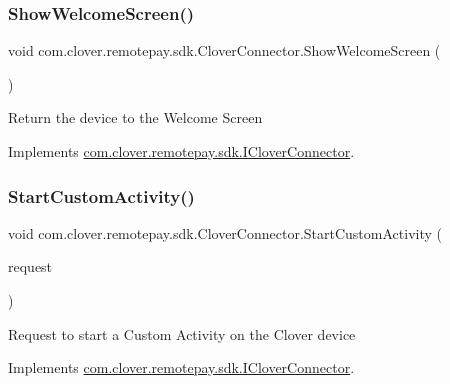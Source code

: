 \subsubsection{\texorpdfstring{Show\+Welcome\+Screen()}{ShowWelcomeScreen()}}
{\footnotesize\ttfamily void com.\+clover.\+remotepay.\+sdk.\+Clover\+Connector.\+Show\+Welcome\+Screen (\begin{DoxyParamCaption}{ }\end{DoxyParamCaption})}



Return the device to the Welcome Screen 



Implements \hyperlink{interfacecom_1_1clover_1_1remotepay_1_1sdk_1_1_i_clover_connector_a462fd3dbb5914ac1d5b906dd1daa57c0}{com.\+clover.\+remotepay.\+sdk.\+I\+Clover\+Connector}.

\mbox{\label{classcom_1_1clover_1_1remotepay_1_1sdk_1_1_clover_connector_a7c4a08c49e7285e95d7e36340ebe3306}} 
\subsubsection{\texorpdfstring{Start\+Custom\+Activity()}{StartCustomActivity()}}
{\footnotesize\ttfamily void com.\+clover.\+remotepay.\+sdk.\+Clover\+Connector.\+Start\+Custom\+Activity (\begin{DoxyParamCaption}\item[{\hyperlink{classcom_1_1clover_1_1remotepay_1_1sdk_1_1_custom_activity_request}{Custom\+Activity\+Request}}]{request }\end{DoxyParamCaption})}



Request to start a Custom Activity on the Clover device 



Implements \hyperlink{interfacecom_1_1clover_1_1remotepay_1_1sdk_1_1_i_clover_connector_a3ec58f5860c34bcb104578caddb0b564}{com.\+clover.\+remotepay.\+sdk.\+I\+Clover\+Connector}.

\mbox{\label{classcom_1_1clover_1_1remotepay_1_1sdk_1_1_clover_connector_a84fa27d8c605594999b39e619b20359e}} 
